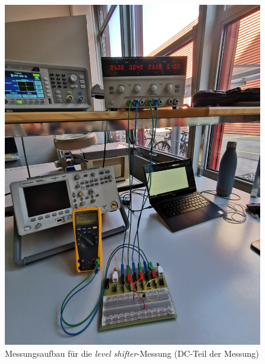 \documentclass[../main.tex]{subfiles}
\begin{document}
\begin{figure}[h]
    \centering
    \includegraphics[scale=0.075]{assets/task3_square/task3_2.jpg}
    \caption{Messungsaufbau für die \textit{level shifter}-Messung (DC-Teil der Messung)}
    \label{fig:setup_task3_2}
\end{figure}
\end{document}
